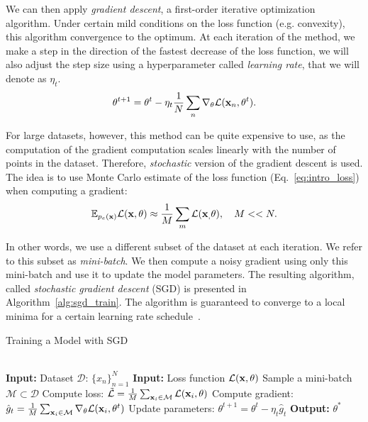 We can then apply \textit{gradient descent}, a first-order iterative optimization algorithm. Under certain mild conditions on the loss function (e.g. convexity), this algorithm convergence to the optimum. At each iteration of the method, we make a step in the direction of the fastest decrease of the loss function, we will also adjust the step size using a hyperparameter called \textit{learning rate}, that we will denote as $\eta_t$.
\begin{equation}\label{eq:intro_gd}
    \theta^{t+1} = \theta^{t} - \eta_{t} \frac1N \sum_n \nabla_{\theta}\mathcal{L}(\rvx_n, \theta^{t}).
\end{equation}

For large datasets, however, this method can be quite expensive to use, as the computation of the gradient computation scales linearly with the number of points in the dataset. Therefore, \textit{stochastic} version of the gradient descent is used. The idea is to use Monte Carlo estimate of the loss function (Eq.~\ref{eq:intro_loss}) when computing a gradient:
\begin{equation}
\mathbb{E}_{p_e({\mathbf{x}})} \mathcal{L}({\mathbf{x}}, \theta) \approx \frac1M \sum_m \mathcal{L}({\mathbf{x}}_, \theta), \quad M << N.
\end{equation}

In other words, we use a different subset of the dataset at each iteration. We refer to this subset as \textit{mini-batch}. We then compute a noisy gradient using only this mini-batch and use it to update the model parameters. The resulting algorithm, called \textit{stochastic gradient descent} (SGD) is presented in Algorithm~\ref{alg:sgd_train}. The algorithm is guaranteed to converge to a local minima for a certain learning rate schedule~\citep{robbins1951stochastic}.

\begin{algorithm}
	\caption{Training a Model with SGD}
	\label{alg:sgd_train}
	\begin{algorithmic}
  \\\hrulefill
\State \hskip-3mm  {\bfseries Input:} { Dataset $\mathcal{D}: \,\{x_n\}_{n=1}^N$}
\State \hskip-3mm  {\bfseries Input:} { Loss function $\mathcal{L}({\mathbf{x}}, \theta)$}
            \State Sample a mini-batch $\mathcal{M} \subset \mathcal{D}$
            \State Compute loss: $ \tilde{\mathcal{L}} = \frac1M \sum_{{\mathbf{x}}_i \in \mathcal{M}} \mathcal{L}({\mathbf{x}}_i, \theta)$
		\State Compute gradient: $\hat{g}_t = \frac1M \sum_{{\mathbf{x}}_i \in \mathcal{M}} \nabla_{\theta} \mathcal{L}({\mathbf{x}}_i, \theta^t)$
		\State Update parameters: $\theta^{t+1} = \theta^{t} - \eta_t \hat{g}_t $
		\EndWhile
            \State \hskip-3mm  {\bfseries Output:} $\theta^*$
	\end{algorithmic}
\end{algorithm}

